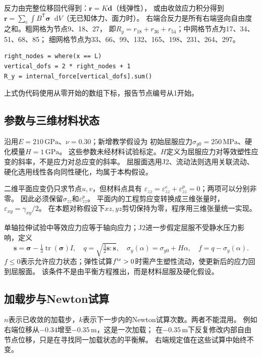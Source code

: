 \documentclass[UTF8,a4paper,fontset=fandol,10pt]{ctexart}
\newcommand{\dd}{\mathop{}\!\mathrm{d}}
\begin{document}
反力由完整位移回代得到：$\mathbf r=K\mathbf d$（线弹性），
或由收敛应力积分得到$\mathbf r=\sum_e\int B^{\mathsf T}\boldsymbol\sigma\dd V$（无已知体力、面力时）。
右端合反力是所有右端竖向自由度之和。粗网格为节点9、18、27，
即$R_y=r_{18}+r_{36}+r_{54}$；中网格节点为17、34、51、68、85；
细网格节点为33、66、99、132、165、198、231、264、297。

\noindent\begin{minipage}{\linewidth}
\begin{lstlisting}
right_nodes = where(x == L)
vertical_dofs = 2 * right_nodes + 1
R_y = internal_force[vertical_dofs].sum()
\end{lstlisting}
\end{minipage}
上式伪代码使用从零开始的数组下标，报告节点编号从1开始。

\subsection{参数与三维材料状态}
沿用$E=210\,\mathrm{GPa}$、$\nu=0.30$；新增教学假设为
初始屈服应力$\sigma_{y0}=250\,\mathrm{MPa}$、硬化模量$H=1\,\mathrm{GPa}$。
这些参数未经材料试验标定。$H$定义为屈服应力对等效塑性应变的斜率，不是应力对总应变的斜率。
屈服面选用J2、流动法则选用关联流动、硬化选用线性各向同性硬化，均属于本构假设。

二维平面应变仍只求节点$u,v$，但材料点具有
$\varepsilon_{zz}=\varepsilon^e_{zz}+\varepsilon^p_{zz}=0$；两项可以分别非零。
因此必须保留$\sigma_{zz}$和$\varepsilon^p_{zz}$。
平面内的工程剪应变转换成三维张量时，$\varepsilon_{xy}=\gamma_{xy}/2$。
在本题对称假设下$xz,yz$剪切保持为零，程序用三维张量统一实现。

单轴拉伸试验中等效应力应等于轴向应力；J2进一步假定屈服不受静水压力影响，定义
\[
\mathbf s=\boldsymbol\sigma-\tfrac13\operatorname{tr}(\boldsymbol\sigma)I,
\quad q=\sqrt{\tfrac32\mathbf s:\mathbf s},
\quad \sigma_y(\alpha)=\sigma_{y0}+H\alpha,
\quad f=q-\sigma_y(\alpha).
\]
$f\le0$表示允许应力状态；弹性试算$f^{\rm tr}>0$时需产生塑性流动，使更新后的应力回到屈服面。
该条件不是由平衡方程推出，而是材料屈服及硬化假设。

\subsection{加载步与Newton试算}
$n$表示已收敛的加载步，$k$表示下一步内的Newton试算次数。两者不能混用。
例如右端位移从$-0.34$增至$-0.35\,\mathrm m$，这是一次加载；
在$-0.35\,\mathrm m$下反复修改内部自由节点位移，只是在寻找同一加载状态的平衡解。
右端规定值在这些试算中始终不变。
\end{document}
